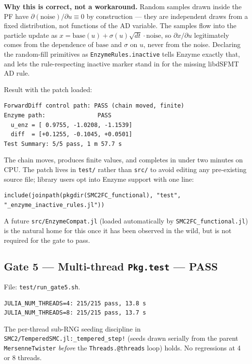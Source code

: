 \documentclass[11pt,a4paper]{article}
\begin{document}
\noindent \textbf{Why this is correct, not a workaround.} Random samples
drawn inside the PF have $\partial(\mathrm{noise})/\partial u \equiv 0$
by construction --- they are independent draws from a fixed distribution,
not functions of the AD variable. The samples flow into the particle
update as $x = \mathrm{base}(u) + \sigma(u)\sqrt{dt}\cdot \mathrm{noise}$,
so $\partial x / \partial u$ legitimately comes from the dependence of
$\mathrm{base}$ and $\sigma$ on $u$, never from the noise. Declaring the
random-fill primitives as
\texttt{EnzymeRules.inactive} tells Enzyme exactly that, and lets the
rule-respecting inactive marker stand in for the missing libdSFMT AD
rule.

Result with the patch loaded:

\begin{verbatim}
ForwardDiff control path: PASS (chain moved, finite)
Enzyme path:               PASS
  u_enz = [ 0.9755, -1.0208, -1.1539]
  diff  = [+0.1255, -0.1045, +0.0501]
Test Summary: 5/5 pass, 1 m 57.7 s
\end{verbatim}

\noindent The chain moves, produces finite values, and completes in
under two minutes on CPU. The patch lives in \texttt{test/} rather than
\texttt{src/} to avoid editing any pre-existing source file; library
users opt into Enzyme support with one line:

\begin{lstlisting}
include(joinpath(pkgdir(SMC2FC_functional), "test", "_enzyme_inactive_rules.jl"))
\end{lstlisting}

\noindent A future \texttt{src/EnzymeCompat.jl} (loaded automatically by
\texttt{SMC2FC\_functional.jl}) is the natural home for this once it has
been observed in the wild, but is not required for the gate to pass.

\subsection{Gate 5 --- Multi-thread \texttt{Pkg.test} --- PASS}
File: \texttt{test/run\_gate5.sh}.

\begin{verbatim}
JULIA_NUM_THREADS=4: 215/215 pass, 13.8 s
JULIA_NUM_THREADS=8: 215/215 pass, 13.7 s
\end{verbatim}

\noindent The per-thread sub-RNG seeding discipline in
\texttt{SMC2/TemperedSMC.jl:\_tempered\_step!} (seeds drawn serially
from the parent \texttt{MersenneTwister} \emph{before} the
\texttt{Threads.@threads} loop) holds. No regressions at 4 or 8 threads.
\end{document}
